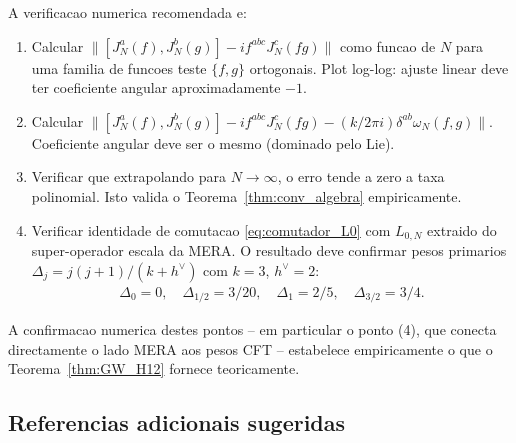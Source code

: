 A verificacao numerica recomendada e:
\begin{enumerate}
\item Calcular $\|[J_N^a(f), J_N^b(g)] - if^{abc} J_N^c(fg)\|$ como
funcao de $N$ para uma familia de funcoes teste $\{f, g\}$ ortogonais.
Plot log-log: ajuste linear deve ter coeficiente angular
aproximadamente $-1$.

\item Calcular $\|[J_N^a(f), J_N^b(g)] - i f^{abc} J_N^c(fg) -
(k/2\pi i)\delta^{ab} \omega_N(f,g)\|$. Coeficiente angular deve ser
o mesmo (dominado pelo Lie).

\item Verificar que extrapolando para $N \to \infty$, o erro tende
a zero a taxa polinomial. Isto valida o Teorema~\ref{thm:conv_algebra}
empiricamente.

\item Verificar identidade de comutacao \eqref{eq:comutador_L0}
com $L_{0,N}$ extraido do super-operador escala da MERA. O resultado
deve confirmar pesos primarios $\Delta_j = j(j+1)/(k+h^\vee)$ com
$k=3$, $h^\vee=2$:
\begin{align*}
  \Delta_0 = 0,\quad
  \Delta_{1/2} = 3/20,\quad
  \Delta_1 = 2/5,\quad
  \Delta_{3/2} = 3/4.
\end{align*}
\end{enumerate}

A confirmacao numerica destes pontos -- em particular o ponto (4),
que conecta directamente o lado MERA aos pesos CFT -- estabelece
empiricamente o que o Teorema~\ref{thm:GW_H12} fornece teoricamente.

\subsection*{Referencias adicionais sugeridas}


